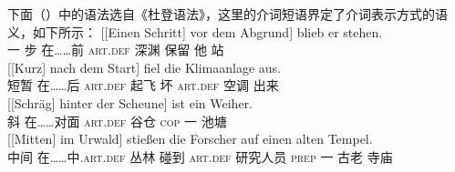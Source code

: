 下面（）中的语法选自《杜登语法》\citep[\S 1300]{Duden2005-Authors}，这里的介词短语界定了介词表示方式的语义，如下所示：
\eal
\ex\label{Beispiel-Schritt-vor-dem-Abgrund} 
\gll {}[[Einen Schritt] vor dem Abgrund] blieb er stehen.\\
	 {}\spacebr{}\spacebr{}一 步 在……前 \textsc{art}.\textsc{def} 深渊 保留 他 站\\
\ex 
\gll {}[[Kurz] nach dem Start] fiel die Klimaanlage aus.\\
	 {}\spacebr{}\spacebr{}短暂 在……后 \textsc{art}.\textsc{def} 起飞 坏 \textsc{art}.\textsc{def} 空调 出来\\
\ex 
\gll {}[[Schräg] hinter der Scheune] ist ein Weiher.\\
	 {}\spacebr{}\spacebr{}斜 在……对面 \textsc{art}.\textsc{def} 谷仓 \textsc{cop} 一 池塘\\
\ex 
\gll {}[[Mitten] im Urwald] stießen die Forscher auf einen alten Tempel.\\
	 {}\spacebr{}\spacebr{}中间 在……中.\textsc{art}.\textsc{def} 丛林 碰到 \textsc{art}.\textsc{def} 研究人员 \textsc{prep} 一 古老 寺庙\\
\zl
